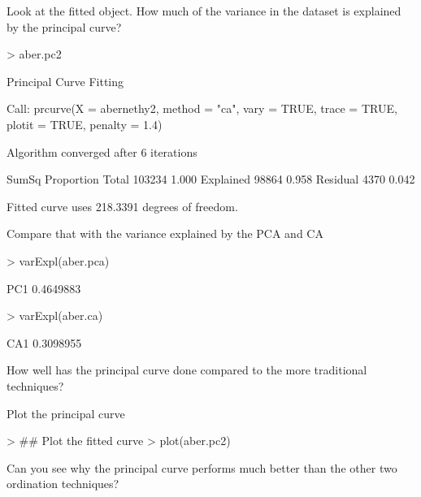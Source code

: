 \documentclass[a4paper,10pt]{article}
\begin{document}
Look at the fitted object. How much of the variance in the dataset is explained
by the principal curve?
\begin{Schunk}
\begin{Sinput}
> aber.pc2
\end{Sinput}
\begin{Soutput}
	Principal Curve Fitting

Call: prcurve(X = abernethy2, method = "ca", vary = TRUE, trace = TRUE,
plotit = TRUE, penalty = 1.4)

Algorithm converged after 6 iterations

           SumSq Proportion
Total     103234      1.000
Explained  98864      0.958
Residual    4370      0.042

Fitted curve uses 218.3391 degrees of freedom.
\end{Soutput}
\end{Schunk}
Compare that with the variance explained by the PCA and CA
\begin{Schunk}
\begin{Sinput}
> varExpl(aber.pca)
\end{Sinput}
\begin{Soutput}
      PC1 
0.4649883 
\end{Soutput}
\begin{Sinput}
> varExpl(aber.ca)
\end{Sinput}
\begin{Soutput}
      CA1 
0.3098955 
\end{Soutput}
\end{Schunk}
How well has the principal curve done compared to the more traditional
techniques?

Plot the principal curve
\begin{Schunk}
\begin{Sinput}
> ## Plot the fitted curve
> plot(aber.pc2)
\end{Sinput}
\end{Schunk}
Can you see why the principal curve performs much better than the other two
ordination techniques?
\end{document}
